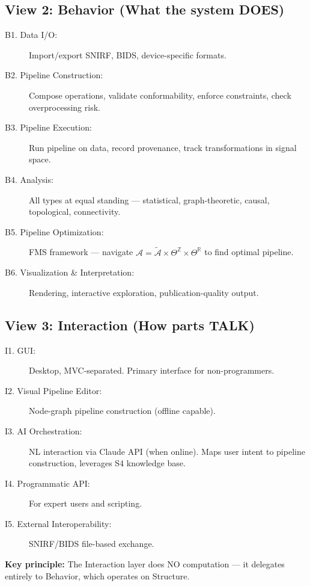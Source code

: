 \documentclass[11pt,a4paper]{article}
\begin{document}
\subsection{View 2: Behavior (What the system DOES)}
\begin{description}
    \item[B1. Data I/O:] Import/export SNIRF, BIDS, device-specific formats.
    \item[B2. Pipeline Construction:] Compose operations, validate conformability, enforce constraints, check overprocessing risk.
    \item[B3. Pipeline Execution:] Run pipeline on data, record provenance, track transformations in signal space.
    \item[B4. Analysis:] All types at equal standing --- statistical, graph-theoretic, causal, topological, connectivity.
    \item[B5. Pipeline Optimization:] FMS framework --- navigate $\mathcal{A} = \tilde{\mathcal{A}} \times \Theta^{\mathbb{Z}} \times \Theta^{\mathbb{R}}$ to find optimal pipeline.
    \item[B6. Visualization \& Interpretation:] Rendering, interactive exploration, publication-quality output.
\end{description}

\subsection{View 3: Interaction (How parts TALK)}
\begin{description}
    \item[I1. GUI:] Desktop, MVC-separated. Primary interface for non-programmers.
    \item[I2. Visual Pipeline Editor:] Node-graph pipeline construction (offline capable).
    \item[I3. AI Orchestration:] NL interaction via Claude API (when online). Maps user intent to pipeline construction, leverages S4 knowledge base.
    \item[I4. Programmatic API:] For expert users and scripting.
    \item[I5. External Interoperability:] SNIRF/BIDS file-based exchange.
\end{description}

\noindent\textbf{Key principle:} The Interaction layer does NO computation --- it delegates entirely to Behavior, which operates on Structure.

\end{document}
